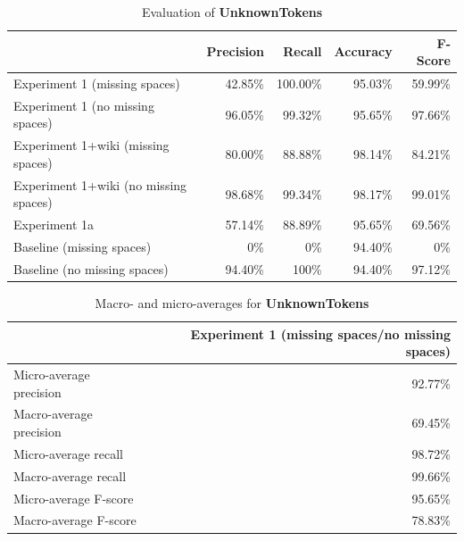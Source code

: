 \documentclass[a4paper,10pt]{scrartcl}
\begin{document}
\begin{table}

\begin{center}
\begin{tabular}{l|r|r|r|r}
& Precision & Recall & Accuracy & F-Score \\
\hline
Experiment 1 (missing spaces) & 42.85\% & 100.00\% & 95.03\% & 59.99\% \\
\hline
Experiment 1 (no missing spaces) & 96.05\% & 99.32\% & 95.65\% & 97.66\% \\
\hline
Experiment 1+wiki (missing spaces) & 80.00\% & 88.88\% & 98.14\% & 84.21\% \\
\hline
Experiment 1+wiki (no missing spaces) & 98.68\% & 99.34\% & 98.17\% & 99.01\% \\
\hline
Experiment 1a & 57.14\% & 88.89\% & 95.65\% & 69.56\% \\
\hline
Baseline (missing spaces) & 0\% & 0\% & 94.40\% & 0\% \\ %
\hline
Baseline (no missing spaces) & 94.40\% & 100\% & 94.40\% & 97.12\% \\
\end{tabular}
\end{center}
\caption{Evaluation of \textbf{UnknownTokens}}
\label{eval3}
\end{table}
\begin{table}

\begin{center}
\begin{tabular}{l|r}
& Experiment 1 (missing spaces/no missing spaces) \\
\hline
Micro-average precision & 92.77\% \\
\hline
Macro-average precision & 69.45\% \\
\hline
Micro-average recall & 98.72\% \\
\hline
Macro-average recall & 99.66\% \\
\hline
Micro-average F-score & 95.65\% \\
\hline
Macro-average F-score & 78.83\% \\
\end{tabular}
\end{center}
\caption{Macro- and micro-averages for \textbf{UnknownTokens}}
\label{eval3}
\end{table}
\end{document}
